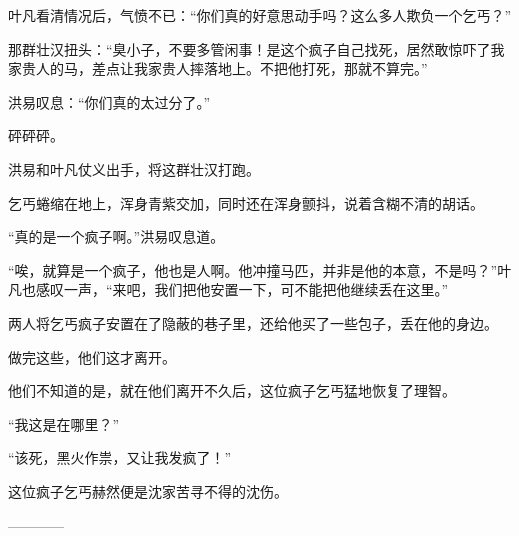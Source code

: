 \begin{this_body}
叶凡看清情况后，气愤不已：“你们真的好意思动手吗？这么多人欺负一个乞丐？”

那群壮汉扭头：“臭小子，不要多管闲事！是这个疯子自己找死，居然敢惊吓了我家贵人的马，差点让我家贵人摔落地上。不把他打死，那就不算完。”

洪易叹息：“你们真的太过分了。”

砰砰砰。

洪易和叶凡仗义出手，将这群壮汉打跑。

乞丐蜷缩在地上，浑身青紫交加，同时还在浑身颤抖，说着含糊不清的胡话。

“真的是一个疯子啊。”洪易叹息道。

“唉，就算是一个疯子，他也是人啊。他冲撞马匹，并非是他的本意，不是吗？”叶凡也感叹一声，“来吧，我们把他安置一下，可不能把他继续丢在这里。”

两人将乞丐疯子安置在了隐蔽的巷子里，还给他买了一些包子，丢在他的身边。

做完这些，他们这才离开。

他们不知道的是，就在他们离开不久后，这位疯子乞丐猛地恢复了理智。

“我这是在哪里？”

“该死，黑火作祟，又让我发疯了！”

这位疯子乞丐赫然便是沈家苦寻不得的沈伤。

------------

\end{this_body}

